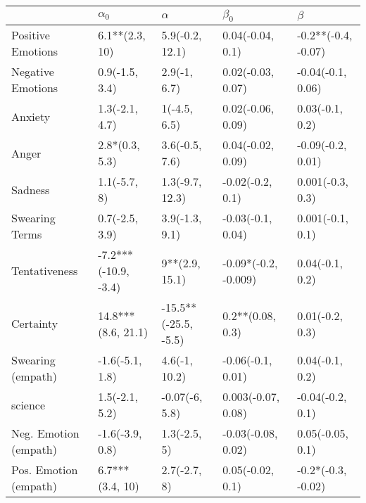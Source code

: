 \begin{tabular}{lllll}
\toprule
{} &            $\alpha_0$ &              $\alpha$ &             $\beta_0$ &              $\beta$ \\
\midrule
Positive Emotions     &        6.1**(2.3, 10) &       5.9(-0.2, 12.1) &      0.04(-0.04, 0.1) &  -0.2**(-0.4, -0.07) \\
Negative Emotions     &        0.9(-1.5, 3.4) &          2.9(-1, 6.7) &     0.02(-0.03, 0.07) &    -0.04(-0.1, 0.06) \\
Anxiety               &        1.3(-2.1, 4.7) &          1(-4.5, 6.5) &     0.02(-0.06, 0.09) &      0.03(-0.1, 0.2) \\
Anger                 &        2.8*(0.3, 5.3) &        3.6(-0.5, 7.6) &     0.04(-0.02, 0.09) &    -0.09(-0.2, 0.01) \\
Sadness               &          1.1(-5.7, 8) &       1.3(-9.7, 12.3) &      -0.02(-0.2, 0.1) &     0.001(-0.3, 0.3) \\
Swearing Terms        &        0.7(-2.5, 3.9) &        3.9(-1.3, 9.1) &     -0.03(-0.1, 0.04) &     0.001(-0.1, 0.1) \\
Tentativeness         &  -7.2***(-10.9, -3.4) &        9**(2.9, 15.1) &  -0.09*(-0.2, -0.009) &      0.04(-0.1, 0.2) \\
Certainty             &    14.8***(8.6, 21.1) &  -15.5**(-25.5, -5.5) &      0.2**(0.08, 0.3) &      0.01(-0.2, 0.3) \\
Swearing (empath)     &       -1.6(-5.1, 1.8) &         4.6(-1, 10.2) &     -0.06(-0.1, 0.01) &      0.04(-0.1, 0.2) \\
science               &        1.5(-2.1, 5.2) &        -0.07(-6, 5.8) &    0.003(-0.07, 0.08) &     -0.04(-0.2, 0.1) \\
Neg. Emotion (empath) &       -1.6(-3.9, 0.8) &          1.3(-2.5, 5) &    -0.03(-0.08, 0.02) &     0.05(-0.05, 0.1) \\
Pos. Emotion (empath) &       6.7***(3.4, 10) &          2.7(-2.7, 8) &      0.05(-0.02, 0.1) &   -0.2*(-0.3, -0.02) \\
\bottomrule
\end{tabular}
